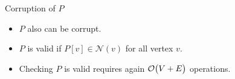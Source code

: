 \begin{columns}
\begin{column}{0.5\textwidth}
\begin{alertblock}{Corruption of $P$}

\begin{itemize}
\item $P$ also can be corrupt.
\item $P$ is valid if $P[v] \in \mathcal{N}(v)$ for all vertex $v$.
\item \color{red} Checking $P$ is valid requires again $\operatorname{\mathcal{O}}\bigl({V+E}\bigr)$ operations.
\end{itemize}
\end{alertblock}
\end{column}
\end{columns}
\lyxframeend{}

